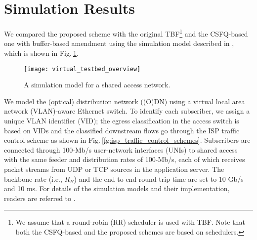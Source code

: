 \documentclass[conference,twoside,final]{IEEEtran}
\begin{document}
\section{Simulation Results}
\label{sec-3}
We compared the proposed scheme with the original TBF\footnote{We assume that a round-robin (RR) scheduler is used with TBF. Note that
both the CSFQ-based and the proposed schemes are based on schedulers.} and the CSFQ-based
one with buffer-based amendment using the simulation model described in
\cite{Kim:14-1}, which is shown in Fig.\(~\)\ref{fg:simulation_model}.
\begin{figure}[!t]
\begin{center}
  \texttt{[image: virtual\_testbed\_overview]}
\end{center}
\caption{A simulation model for a shared access network.}
\label{fg:simulation_model}
\end{figure}
We model the (optical) distribution network ((O)DN) using a virtual local area
network (VLAN)-aware Ethernet switch. To identify each subscriber, we assign a
unique VLAN identifier (VID); the egress classification in the access switch is
based on VIDs and the classified downstream flows go through the ISP traffic
control scheme as shown in Fig.\(~\)\ref{fg:isp_traffic_control_schemes}.
Subscribers are connected through 100-Mb/s user-network interfaces (UNIs) to
shared access with the same feeder and distribution rates of 100-Mb/s, each of
which receives packet streams from UDP or TCP sources in the application
server. The backbone rate (i.e., \(R_{B}\)) and the end-to-end round-trip time
are set to 10 Gb/s and 10 ms. For details of the simulation models and their
implementation, readers are referred to \cite{Kim:14-2}.
\end{document}
